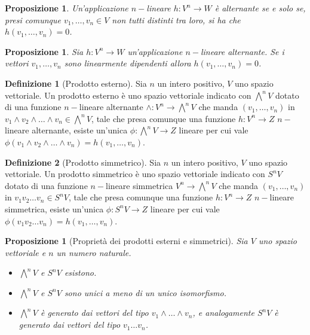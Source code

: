 \documentclass[11pt]{article}
\theoremstyle{plain}
\newtheorem{prop}[thm]{Proposizione}
\theoremstyle{definition}
\newtheorem{defn}{Definizione}[section]
\theoremstyle{remark}
\begin{document}
\begin{prop}
  Un'applicazione $n-$lineare $h: V^n \to W$ è alternante se e solo se, presi comunque $v_1,\dots,v_n\in V$
  non tutti distinti tra loro, si ha che $h(v_1,\dots,v_n)=0$.
\end{prop}

\begin{prop}
  Sia $h: V^n \to W$ un'applicazione $n-$lineare alternante. Se i vettori $v_1,\dots,v_n$ sono linearmente dipendenti allora
  $h(v_1,\dots,v_n)=0$.
\end{prop}


\begin{defn}[Prodotto esterno]
Sia $n$ un intero positivo, $V$ uno spazio vettoriale. Un prodotto esterno è uno spazio vettoriale indicato con $\bigwedge^n V$
dotato di una funzione $n-$lineare alternante $\wedge: V^n \to \bigwedge^n V$ che manda $(v_1,\ldots,v_n)$ in 
$v_1\wedge v_2\wedge\ldots\wedge v_n \in \bigwedge^n V$, tale che presa comunque una funzione $h: V^n \to Z$ $n-$lineare alternante, 
esiste un'unica $\phi: \bigwedge^n V \to Z $ lineare per cui vale $\phi(v_1\wedge v_2\wedge \ldots \wedge v_n)=h(v_1,\ldots,v_n)$.
\label{defn:prodotto esterno}
\end{defn}

\begin{defn}[Prodotto simmetrico]
Sia $n$ un intero positivo, $V$ uno spazio vettoriale. Un prodotto simmetrico è uno spazio vettoriale indicato con $S^n V$
dotato di una funzione $n-$lineare simmetrica $V^n \to \bigwedge^n V$ che manda $(v_1,\ldots,v_n)$ in 
$v_1 v_2\ldots v_n \in S^n V$, tale che presa comunque una funzione $h: V^n \to Z$ $n-$lineare simmetrica, 
esiste un'unica $\phi: S^n V \to Z $ lineare per cui vale $\phi(v_1 v_2 \ldots v_n)=h(v_1,\ldots,v_n)$.
\label{defn:prodotto simmetrico}
\end{defn}


\begin{prop}[Proprietà dei prodotti esterni e simmetrici]
Sia $V$ uno spazio vettoriale e $n$ un numero naturale.
\begin{itemize}
\item $\bigwedge^nV$ e $S^nV$ esistono.
\item $\bigwedge^nV$ e $S^nV$ sono unici a meno di un unico isomorfismo.
\item $\bigwedge^nV$ è generato dai vettori del tipo $v_1\wedge \dots \wedge v_n$, e analogamente 
      $S^nV$ è generato dai vettori del tipo $v_1\dots v_n$.
\end{itemize}
\end{prop}
\end{document}
